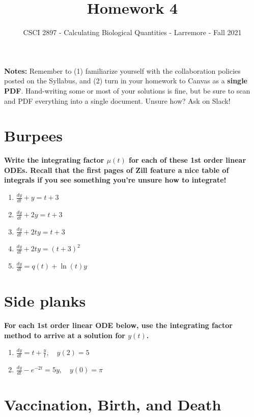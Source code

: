 \documentclass[11pt,onecolumn,superscriptaddress,notitlepage]{article}
\date{}
\newcommand{\dy}[0]{\displaystyle\frac{dy}{dt}}
\begin{document}
\author{CSCI 2897 - Calculating Biological Quantities - Larremore - Fall 2021}
\title{Homework 4}
\maketitle

{\bf Notes:} Remember to (1) familiarize yourself with the collaboration policies posted on the Syllabus, and (2) turn in your homework to Canvas as a {\bf single PDF}. Hand-writing some or most of your solutions is fine, but be sure to scan and PDF everything into a single document. Unsure how? Ask on Slack! 

\section*{Burpees}

{\bf Write the integrating factor $\mu(t)$ for each of these 1st order linear ODEs. Recall that the first pages of Zill feature a nice table of integrals if you see something you're unsure how to integrate!} 

\begin{enumerate}
	\item $\dy + y = t+3$
	\item $\dy + 2y = t+3$
	\item $\dy + 2ty = t+3$
	\item $\dy + 2ty = (t+3)^2$
	\item $\dy = q(t) + \ln(t)y$
\end{enumerate}

\section*{Side planks} 

{\bf For each 1st order linear ODE below, use the integrating factor method to arrive at a solution for $y(t)$.}

\begin{enumerate}[resume]
	\item $\dy = t + \frac{y}{t}, \quad y(2) = 5$
	\item $\dy - e^{-2t} = 5y, \quad y(0) = \pi$
\end{enumerate}

\clearpage
\section*{Vaccination, Birth, and Death} 
\end{document}

